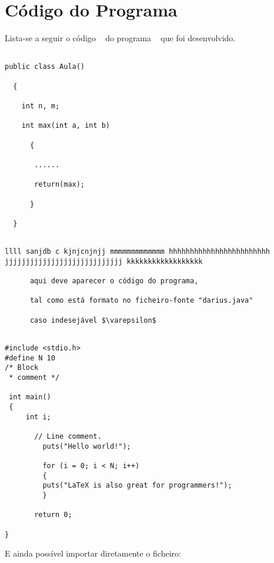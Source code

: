 \documentclass[pdftex,12pt,a4paper]{report}
\begin{document}

\begin{abstract}





\end{abstract}

\tableofcontents









\appendix

\chapter{Código do Programa}



Lista-se a seguir o código \java~\cite{citeulike:4677363} do programa
\darius~\cite{FCH11a} que foi desenvolvido.

\begin{verbatim}

public class Aula()

  {

    int n, m;

    int max(int a, int b)

      {

       ......

       return(max);

      }

  }

\end{verbatim}



\begin{verbatim}

llll sanjdb c kjnjcnjnjj mmmmmmmmmmmmm hhhhhhhhhhhhhhhhhhhhhhhh
jjjjjjjjjjjjjjjjjjjjjjjjjjjj kkkkkkkkkkkkkkkkkk

      aqui deve aparecer o código do programa,

      tal como está formato no ficheiro-fonte "darius.java"

      caso indesejável $\varepsilon$

\end{verbatim}



\begin{verbatim}

#include <stdio.h>
#define N 10
/* Block
 * comment */

 int main()
 {
     int i;
	 
	   // Line comment.
		 puts("Hello world!");
			     
		 for (i = 0; i < N; i++)
		 {
		 puts("LaTeX is also great for programmers!");
		 }
										 
	   return 0;
				
}
\end{verbatim}


E ainda possível importar diretamente o ficheiro:










\end{document}
